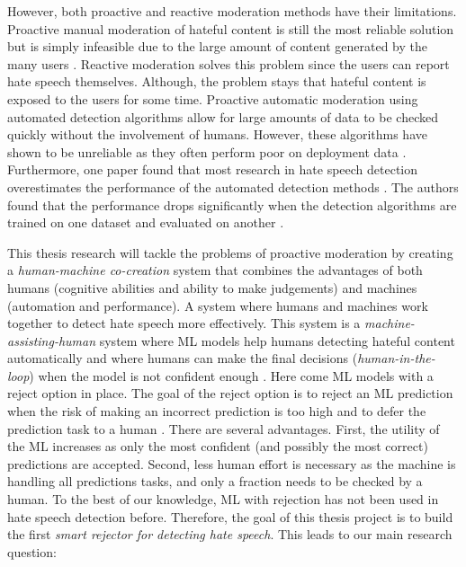However, both proactive and reactive moderation methods have their limitations. Proactive manual moderation of hateful content is still the most reliable solution but is simply infeasible due to the large amount of content generated by the many users \cite{balayn2021automatic}. Reactive moderation solves this problem since the users can report hate speech themselves. Although, the problem stays that hateful content is exposed to the users for some time. Proactive automatic moderation using automated detection algorithms allow for large amounts of data to be checked quickly without the involvement of humans. However, these algorithms have shown to be unreliable as they often perform poor on deployment data \cite{balayn2021automatic}. Furthermore, one paper found that most research in hate speech detection overestimates the performance of the automated detection methods \cite{arango2019hate}. The authors found that the performance drops significantly when the detection algorithms are trained on one dataset and evaluated on another \cite{arango2019hate}.

This thesis research will tackle the problems of proactive moderation by creating a \textit{human-machine co-creation} \cite{woo2020future} system that combines the advantages of both humans (cognitive abilities and ability to make judgements) and machines (automation and performance). A system where humans and machines work together to detect hate speech more effectively. This system is a \textit{machine-assisting-human} system where ML models help humans detecting hateful content automatically and where humans can make the final decisions (\textit{human-in-the-loop}) when the model is not confident enough \cite{woo2020future}. Here come ML models with a reject option in place. The goal of the reject option is to reject an ML prediction when the risk of making an incorrect prediction is too high and to defer the prediction task to a human \cite{hendrickx2021machine}. There are several advantages. First, the utility of the ML increases as only the most confident (and possibly the most correct) predictions are accepted. Second, less human effort is necessary as the machine is handling all predictions tasks, and only a fraction needs to be checked by a human. To the best of our knowledge, ML with rejection has not been used in hate speech detection before. Therefore, the goal of this thesis project is to build the first \textit{smart rejector for detecting hate speech}. This leads to our main research question:


